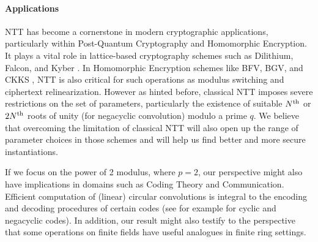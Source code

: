 \paragraph{Applications}
NTT has become a cornerstone in modern cryptographic applications, particularly within Post-Quantum Cryptography and Homomorphic Encryption. It plays a vital role in lattice-based cryptography schemes such as Dilithium, Falcon, and Kyber \cite{IACR:Dilithium17,ASIACRYPT:Falcon18,IEEE:Kyber18}.  In Homomorphic Encryption schemes like BFV, BGV, and CKKS \cite{ACM:Brakerski12,IEEE:BGV11,ASIACRYPT:CKKS17}, NTT is also critical for such operations as modulus switching and ciphertext relinearization. However as hinted before, classical NTT imposes severe restrictions on the set of parameters, particularly the existence of suitable \(N\textsuperscript{th}\) or \(2N\textsuperscript{th}\) roots of unity (for negacyclic convolution) modulo a prime \(q\). We believe that overcoming the limitation of classical NTT will also open up the range of parameter choices in those schemes and will help us find better and more secure instantiations.

If we focus on the power of 2 modulus, where \(p = 2\), our perspective might also have implications in domains such as Coding Theory and Communication. Efficient computation of (linear) circular convolutions is integral to the encoding and decoding procedures of certain codes (see for example \cite{UNC:Berlekamp69,AMC:DouSah22} for cyclic and negacyclic codes). In addition, our result might also testify to the perspective that some operations on finite fields have useful analogues in finite ring settings.